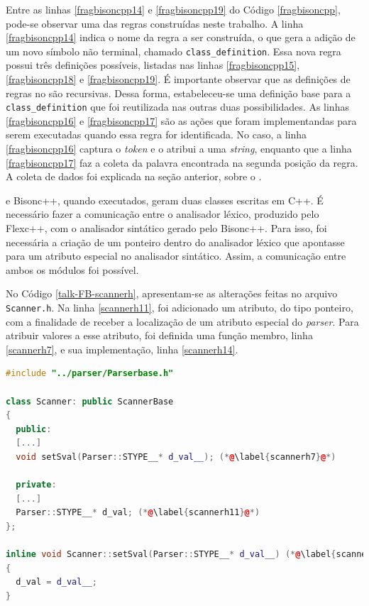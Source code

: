 Entre as linhas \ref{fragbisoncpp14} e \ref{fragbisoncpp19} do Código
\ref{fragbisoncpp}, pode-se observar uma das regras construídas neste trabalho.
A linha \ref{fragbisoncpp14} indica o nome da regra a ser construída, o que
gera a adição de um novo símbolo não terminal, chamado
\lstinline|class_definition|. Essa nova regra possui três definições possíveis,
listadas nas linhas \ref{fragbisoncpp15}, \ref{fragbisoncpp18} e
\ref{fragbisoncpp19}. É importante observar que as definições de regras no
\bisoncpp são recursivas. Dessa forma, estabeleceu-se uma definição base para a
\lstinline|class_definition| que foi reutilizada nas outras duas possibilidades.
As linhas \ref{fragbisoncpp16} e \ref{fragbisoncpp17} são as ações que foram
implementandas para serem executadas quando essa regra for identificada.
No caso, a linha \ref{fragbisoncpp16} captura o \textit{token} e o atribui a uma \textit{string}, enquanto que a linha \ref{fragbisoncpp17} faz a coleta da
palavra encontrada na segunda posição da regra. A coleta de dados foi explicada na
seção anterior, sobre o \Scarefault.

\flexcpp e \textsf{Bisonc++}, quando executados, geram duas classes escritas
em C++.
É necessário fazer a comunicação entre o analisador léxico, produzido pelo
\textsf{Flexc++}, com o analisador sintático gerado pelo \textsf{Bisonc++}.
Para isso, foi necessária a criação de um ponteiro dentro do analisador
léxico que apontasse para um atributo especial no analisador sintático.
Assim, a comunicação entre ambos os módulos foi possível.

No Código \ref{talk-FB-scannerh}, apresentam-se as alterações feitas no
arquivo \lstinline|Scanner.h|. Na linha \ref{scannerh11}, foi adicionado um atributo,
do tipo ponteiro, com a finalidade de receber a localização de um atributo especial
do \textit{parser}. Para atribuir valores a esse atributo, foi definida uma
função membro, linha \ref{scannerh7}, e sua implementação, linha \ref{scannerh14}.
\begin{lstlisting}[language=C++, label=talk-FB-scannerh, caption=Alterações no Scanner.h para comunicação entre analisadores léxico e sintático]
#include "../parser/Parserbase.h"

class Scanner: public ScannerBase
{
  public:
  [...]
  void setSval(Parser::STYPE__* d_val__); (*@\label{scannerh7}@*)

  private:
  [...]
  Parser::STYPE__* d_val; (*@\label{scannerh11}@*)
};

inline void Scanner::setSval(Parser::STYPE__* d_val__) (*@\label{scannerh14}@*)
{
  d_val = d_val__;
}
\end{lstlisting}

